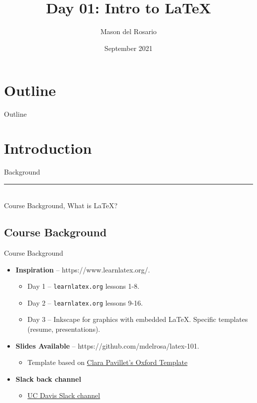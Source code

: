 \documentclass{beamer}
\title{Day 01: Intro to \LaTeX }
\author{\small{Mason del Rosario}}
\institute{\LaTeX 101}
\date{September 2021} %
\begin{document}
\footnotesize{
% 


{ 
\frame{\titlepage}}

\section*{Outline}\begin{frame}{Outline}\tableofcontents\end{frame}

\section{Introduction}

  \begin{frame}[plain]
    \vfill
    \centering
    \begin{beamercolorbox}[sep=8pt,center,shadow=true,rounded=true]{Background}
      \insertsectionhead\par%
      \color{davisblue}\noindent\rule{10cm}{1pt} \\
      \footnotesize{Course Background, What is \LaTeX?}
    \end{beamercolorbox}
    \vfill
  \end{frame}
  
\subsection{Course Background}

  \begin{frame}{Course Background}
    \begin{itemize} 
      \item \textbf{Inspiration} -- https://www.learnlatex.org/. 
        \begin{itemize}
          \item Day 1 -- \texttt{learnlatex.org} lessons 1-8.
          \item Day 2 -- \texttt{learnlatex.org} lessons 9-16.
          \item Day 3 -- Inkscape for graphics with embedded \LaTeX. Specific templates (resume, presentations).
        \end{itemize}
      \item \textbf{Slides Available} -- https://github.com/mdelrosa/latex-101.
      \begin{itemize}
        \item Template based on \href{https://www.overleaf.com/latex/templates/oxpav/xnjgrxthvjhg}{Clara Pavillet's Oxford Template}
      \end{itemize}
      \item \textbf{Slack back channel}
      \begin{itemize}
        \item \href{https://join.slack.com/share/zt-ul82okyc-SI2GftuwPx_lFyBXll9rjw}{UC Davis Slack channel}
      \end{itemize}
    \end{itemize}
  \end{frame}

}
\end{document}
